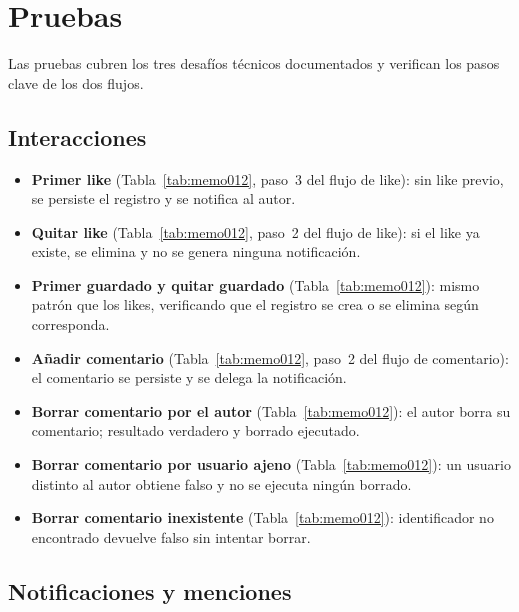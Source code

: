 \section{Pruebas}

Las pruebas cubren los tres desafíos técnicos documentados y verifican los pasos clave de los dos flujos.

\subsection*{Interacciones}

\begin{itemize}
    \item \textbf{Primer like} (Tabla~\ref{tab:memo012}, paso~3 del flujo de like): sin like previo, se persiste el registro y se notifica al autor.

    \item \textbf{Quitar like} (Tabla~\ref{tab:memo012}, paso~2 del flujo de like): si el like ya existe, se elimina y no se genera ninguna notificación.

    \item \textbf{Primer guardado y quitar guardado} (Tabla~\ref{tab:memo012}): mismo patrón que los likes, verificando que el registro se crea o se elimina según corresponda.

    \item \textbf{Añadir comentario} (Tabla~\ref{tab:memo012}, paso~2 del flujo de comentario): el comentario se persiste y se delega la notificación.

    \item \textbf{Borrar comentario por el autor} (Tabla~\ref{tab:memo012}): el autor borra su comentario; resultado verdadero y borrado ejecutado.

    \item \textbf{Borrar comentario por usuario ajeno} (Tabla~\ref{tab:memo012}): un usuario distinto al autor obtiene falso y no se ejecuta ningún borrado.

    \item \textbf{Borrar comentario inexistente} (Tabla~\ref{tab:memo012}): identificador no encontrado devuelve falso sin intentar borrar.
\end{itemize}

\subsection*{Notificaciones y menciones}

